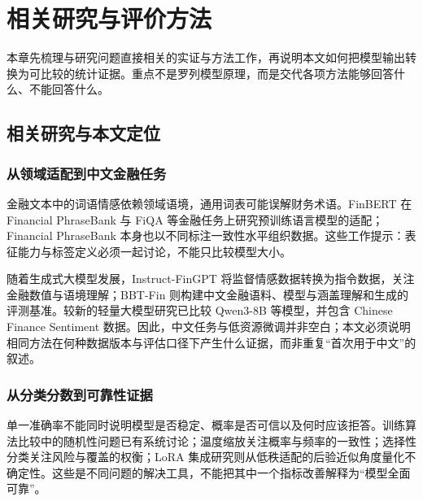 \clearpage\section{相关研究与评价方法}

本章先梳理与研究问题直接相关的实证与方法工作，再说明本文如何把模型输出转换为可比较的统计证据。重点不是罗列模型原理，而是交代各项方法能够回答什么、不能回答什么。

\FloatBarrier\subsection{相关研究与本文定位}

\subsubsection{从领域适配到中文金融任务}

金融文本中的词语情感依赖领域语境，通用词表可能误解财务术语\cite{ref6}。FinBERT 在 Financial PhraseBank 与 FiQA 等金融任务上研究预训练语言模型的适配\cite{ref8}；Financial PhraseBank 本身也以不同标注一致性水平组织数据\cite{ref20}。这些工作提示：表征能力与标签定义必须一起讨论，不能只比较模型大小。

随着生成式大模型发展，Instruct-FinGPT 将监督情感数据转换为指令数据，关注金融数值与语境理解\cite{ref16}；BBT-Fin 则构建中文金融语料、模型与涵盖理解和生成的评测基准\cite{ref19}。较新的轻量大模型研究已比较 Qwen3-8B 等模型，并包含 Chinese Finance Sentiment 数据\cite{ref18}。因此，中文任务与低资源微调并非空白；本文必须说明相同方法在何种数据版本与评估口径下产生什么证据，而非重复``首次用于中文''的叙述。

\subsubsection{从分类分数到可靠性证据}

单一准确率不能同时说明模型是否稳定、概率是否可信以及何时应该拒答。训练算法比较中的随机性问题已有系统讨论\cite{ref21}；温度缩放关注概率与频率的一致性\cite{ref22}；选择性分类关注风险与覆盖的权衡\cite{ref23}；LoRA 集成研究则从低秩适配的后验近似角度量化不确定性\cite{ref24}。这些是不同问题的解决工具，不能把其中一个指标改善解释为``模型全面可靠''。

